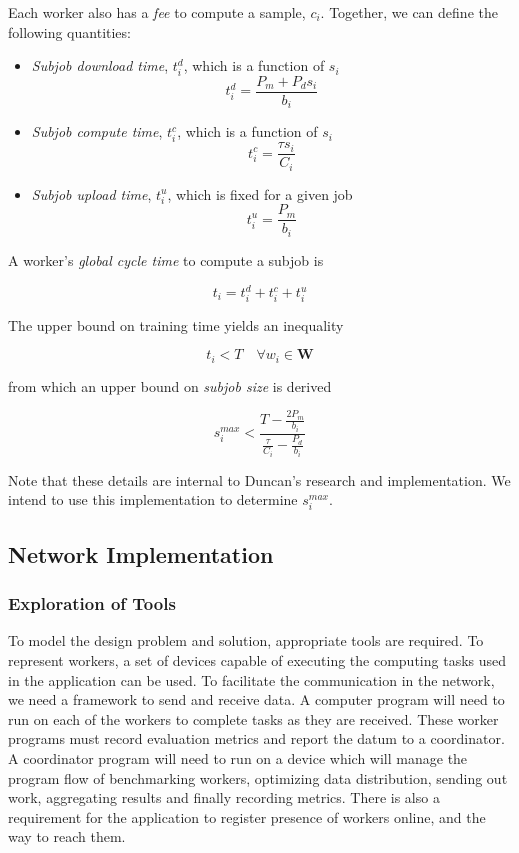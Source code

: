 \documentclass[../mthe-493-final-project.tex]{subfiles}
\begin{document}
    Each worker also has a \textit{fee} to compute a sample, $c_i$. Together, we can define the following quantities:

    \begin{itemize}
        \item \textit{Subjob download time}, $t^d_i$, which is a function of $s_i$
              \[t^d_i = \frac{P_m + P_d s_i}{b_i}\]
        \item \textit{Subjob compute time}, $t^c_i$, which is a function of $s_i$
              \[t^c_i = \frac{\tau s_i}{C_i}\]
        \item \textit{Subjob upload time}, $t^u_i$, which is fixed for a given job
              \[t^u_i = \frac{P_m}{b_i}\]
    \end{itemize}

    A worker's \textit{global cycle time} to compute a subjob is

    \[t_i = t^d_i + t^c_i + t^u_i\]

    The upper bound on training time yields an inequality

    \[t_i < T \quad \forall w_i \in \mathbf{W}\]

    from which an upper bound on \textit{subjob size} is derived

    \[s^{max}_i < \frac{T - \frac{2 P_m}{b_i}}{\frac{\tau}{C_i} - \frac{P_d}{b_i}}\]

    Note that these details are internal to Duncan's research and implementation. We intend to use this implementation to determine $s^{max}_i$.
    

    \subsection{Network Implementation}
    \label{ssec:network-implementation}

    \subsubsection{Exploration of Tools}
    To model the design problem and solution, appropriate tools are required. To represent workers, a set of devices capable of executing the computing tasks used in the application can be used. To facilitate the communication in the network, we need a framework to send and receive data. A computer program will need to run on each of the workers to complete tasks as they are received. These worker programs must record evaluation metrics and report the datum to a coordinator. A coordinator program will need to run on a device which will manage the program flow of benchmarking workers, optimizing data distribution, sending out work, aggregating results and finally recording metrics. There is also a requirement for the application to register presence of workers online, and the way to reach them.
\end{document}
